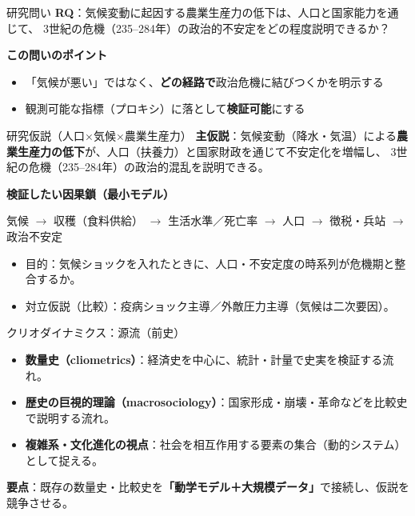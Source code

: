 \documentclass[aspectratio=169,11pt]{beamer}
\begin{document}
\begin{frame}{研究問い}
  \textbf{RQ}：気候変動に起因する農業生産力の低下は、人口と国家能力を通じて、
  3世紀の危機（235--284年）の政治的不安定をどの程度説明できるか？

  \vspace{0.8em}
  \textbf{この問いのポイント}
  \begin{itemize}
    \item 「気候が悪い」ではなく、\textbf{どの経路で}政治危機に結びつくかを明示する
    \item 観測可能な指標（プロキシ）に落として\textbf{検証可能}にする
  \end{itemize}
\end{frame}

\begin{frame}{研究仮説（人口×気候×農業生産力）}
  \textbf{主仮説}：気候変動（降水・気温）による\textbf{農業生産力の低下}が、人口（扶養力）と国家財政を通じて不安定化を増幅し、
  3世紀の危機（235--284年）の政治的混乱を説明できる。

  \vspace{0.6em}
  \textbf{検証したい因果鎖（最小モデル）}
  \begin{center}
    \small
    気候 $\rightarrow$ 収穫（食料供給） $\rightarrow$ 生活水準／死亡率 $\rightarrow$ 人口 $\rightarrow$ 徴税・兵站 $\rightarrow$ 政治不安定
  \end{center}

  \vspace{0.4em}
  \begin{itemize}
    \item 目的：気候ショックを入れたときに、人口・不安定度の時系列が危機期と整合するか。
    \item 対立仮説（比較）：疫病ショック主導／外敵圧力主導（気候は二次要因）。
  \end{itemize}
\end{frame}

\begin{frame}{クリオダイナミクス：源流（前史）}
  \begin{itemize}
    \item \textbf{数量史（cliometrics）}：経済史を中心に、統計・計量で史実を検証する流れ。
    \item \textbf{歴史の巨視的理論（macrosociology）}：国家形成・崩壊・革命などを比較史で説明する流れ。
    \item \textbf{複雑系・文化進化の視点}：社会を相互作用する要素の集合（動的システム）として捉える。
  \end{itemize}

  \vspace{0.6em}
  \textbf{要点}：既存の数量史・比較史を\textbf{「動学モデル＋大規模データ」}で接続し、仮説を競争させる。
\end{frame}
\end{document}
